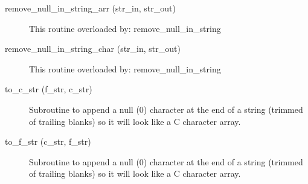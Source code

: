 \begin{description}
\label{r:remove.null.in.string.arr}
\item[remove_null_in_string_arr (str_in, str_out)] \Newline 
This routine overloaded by:
       remove_null_in_string

\label{r:remove.null.in.string.char}
\item[remove_null_in_string_char (str_in, str_out)] \Newline 
This routine overloaded by:
       remove_null_in_string

\label{r:to.c.str}
\item[to_c_str (f_str, c_str)] \Newline 
Subroutine to append a null (0) character at the end of a string (trimmed
of trailing blanks) so it will look like a C character array. 

\label{r:to.f.str}
\item[to_f_str (c_str, f_str)] \Newline 
Subroutine to append a null (0) character at the end of a string (trimmed
of trailing blanks) so it will look like a C character array. 

\end{description}

%
%
